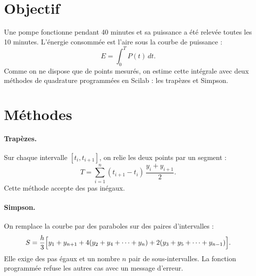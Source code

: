 \section{Objectif}
Une pompe fonctionne pendant 40 minutes et sa puissance a été relevée toutes
les 10 minutes. L'énergie consommée est l'aire sous la courbe de puissance :
\[
  E = \int_0^{T} P(t)\,dt .
\]
Comme on ne dispose que de points mesurés, on estime cette intégrale avec deux
méthodes de quadrature programmées en Scilab : les trapèzes et Simpson.

\section{Méthodes}
\paragraph{Trapèzes.} Sur chaque intervalle $[t_i, t_{i+1}]$, on relie les deux
points par un segment :
\[
  T = \sum_{i=1}^{n} (t_{i+1}-t_i)\,\frac{y_i+y_{i+1}}{2}.
\]
Cette méthode accepte des pas inégaux.

\paragraph{Simpson.} On remplace la courbe par des paraboles sur des paires
d'intervalles :
\[
  S = \frac{h}{3}\Bigl[y_1 + y_{n+1} + 4(y_2+y_4+\dots+y_n)
      + 2(y_3+y_5+\dots+y_{n-1})\Bigr].
\]
Elle exige des pas égaux et un nombre $n$ pair de sous-intervalles. La fonction
programmée refuse les autres cas avec un message d'erreur.
